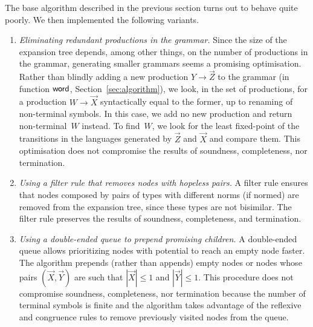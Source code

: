 The base algorithm described in the previous section turns out to
behave quite poorly. We then implemented the following variants.
%
\begin{enumerate}
\item \emph{Eliminating redundant productions in the grammar.}  Since
  the size of the expansion tree depends, among other things, on the
  number of productions in the grammar, generating smaller grammars
  seems a promising optimisation. Rather than blindly adding a new
  production $Y \rightarrow \vec Z$ to the grammar (in function
  $\mathsf{word}$, Section~\ref{sec:algorithm}), we look, in the set of
  productions, for a production $W \rightarrow \vec X$ syntactically
  equal to the former, up to renaming of non-terminal symbols.  In
  this case, we add no new production and return non-terminal~$W$
  instead. To find~$W$, we look for the least fixed-point of the
  transitions in the languages generated by $\vec Z$ and $\vec X$ and
  compare them.  This optimisation does not compromise the results of
  soundness, completeness, nor termination.
  \item
  \emph{Using a filter rule that removes nodes with hopeless pairs.} A
  filter rule ensures that nodes composed by pairs of types with
  different norms (if normed) are removed from the expansion tree,
  since these types are not bisimilar.  
  The filter rule
  preserves the results of soundness, completeness, and termination.
  \item
  \emph{Using a double-ended queue to prepend promising children.} A
  double-ended queue allows prioritizing nodes with potential to reach
  an empty node faster.  The algorithm prepends (rather than appends)
  empty nodes or nodes whose pairs $(\vec X, \vec Y)$ are such that
  $|\vec X|\leq 1$ and $|\vec Y| \leq 1$.
  This procedure does not compromise soundness, completeness, nor
  termination because the number of terminal symbols is finite and the 
  algorithm takes advantage of the reflexive and congruence 
  rules to remove previously visited nodes from the queue.
\end{enumerate}

